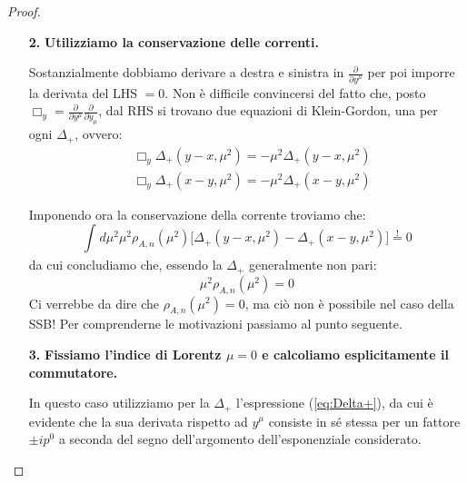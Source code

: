 \documentclass[../main.tex]{subfiles}
\begin{document}
\begin{proof}
\begin{enumerate}
        \item[\textbf{2.}] \textbf{Utilizziamo la conservazione delle correnti.}

        Sostanzialmente dobbiamo derivare a destra e sinistra in $\frac{\partial}{\partial y^\mu}$ per poi imporre la derivata del LHS $= 0$. Non è difficile convincersi del fatto che, posto $\Box_y= \frac{\partial}{\partial y^\mu}\frac{\partial}{\partial y_\mu}$, dal RHS si trovano due equazioni di Klein-Gordon, una per ogni $\Delta_+$, ovvero:
        \begin{align*}
            &\Box_y\Delta_+(y-x, \mu^2) = -\mu^2\Delta_+(y-x, \mu^2)\\
            &\Box_y\Delta_+(x-y, \mu^2) = -\mu^2\Delta_+(x-y, \mu^2)
        \end{align*}

        Imponendo ora la conservazione della corrente troviamo che:
        \[
        \int_{}d\mu^2\mu^2{\rho}_{A,n}(\mu^2)\big[\Delta_+(y-x, \mu^2) - \Delta_+(x-y, \mu^2)\big] \overset{!}{=} 0
        \]
        da cui concludiamo che, essendo la $\Delta_+$ generalmente non pari:
        \begin{equation}
            \boxed{\mu^2{\rho}_{A,n}(\mu^2) = 0}
            \label{eq:mu2rho=0}
        \end{equation}
        Ci verrebbe da dire che ${\rho}_{A,n}(\mu^2)=0$, ma ciò non è possibile nel caso della SSB! Per comprenderne le motivazioni passiamo al punto seguente.
        
        \item[\textbf{3.}] \textbf{Fissiamo l'indice di Lorentz $\mu=0$ e calcoliamo esplicitamente il commutatore.}

        In questo caso utilizziamo per la $\Delta_+$ l'espressione (\ref{eq:Delta+}), da cui è evidente che la sua derivata rispetto ad $y^\mu$ consiste in sé stessa per un fattore $\pm ip^0$ a seconda del segno dell'argomento dell'esponenziale considerato.


\end{enumerate}
\end{proof}
\end{document}

